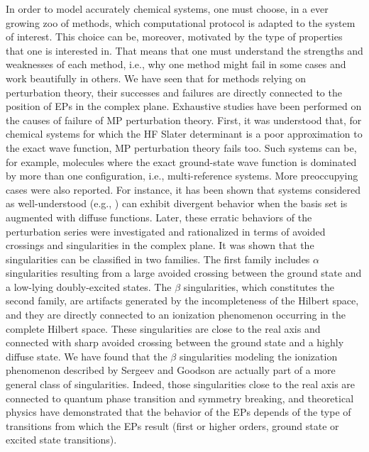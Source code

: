 \documentclass[11pt,a4paper]{article}
\begin{document}
In order to model accurately chemical systems, one must choose, in a ever growing zoo of methods, which computational protocol is adapted to the system of interest.
This choice can be, moreover, motivated by the type of properties that one is interested in.
That means that one must understand the strengths and weaknesses of each method, i.e., why one method might fail in some cases and work beautifully in others. 
We have seen that for methods relying on perturbation theory, their successes and failures are directly connected to the position of EPs in the complex plane. 
Exhaustive studies have been performed on the causes of failure of MP perturbation theory. 
First, it was understood that, for chemical systems for which the HF Slater determinant is a poor approximation to the exact wave function, MP perturbation theory fails too. Such systems can be, for example, molecules where the exact ground-state wave function is dominated by more than one configuration, i.e., multi-reference systems. 
More preoccupying cases were also reported. 
For instance, it has been shown that systems considered as well-understood (e.g., ) can exhibit divergent behavior when the basis set is augmented with diffuse functions. 
Later, these erratic behaviors of the perturbation series were investigated and rationalized in terms of avoided crossings and singularities in the complex plane. It was shown that the singularities can be classified in two families. 
The first family includes $\alpha$ singularities resulting from a large avoided crossing between the ground state and a low-lying doubly-excited states. 
The $\beta$ singularities, which constitutes the second family, are artifacts generated by the incompleteness of the Hilbert space, and they are directly connected to an ionization phenomenon occurring in the complete Hilbert space. 
These singularities are close to the real axis and connected with sharp avoided crossing between the ground state and a highly diffuse state. 
We have found that the $\beta$ singularities modeling the ionization phenomenon described by Sergeev and Goodson are actually part of a more general class of singularities. Indeed, those singularities close to the real axis are connected to quantum phase transition and symmetry breaking, and theoretical physics have demonstrated that the behavior of the EPs depends of the type of transitions from which the EPs result (first or higher orders, ground state or excited state transitions).
\end{document}
